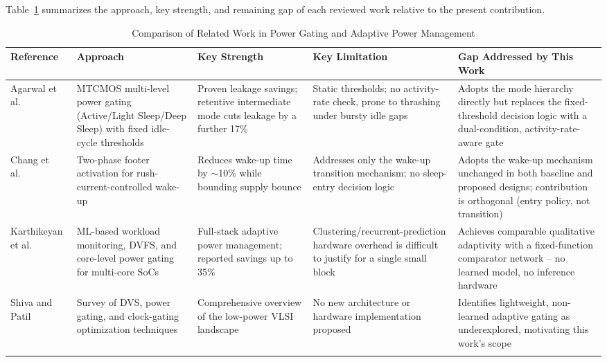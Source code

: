 Table~\ref{tab:related} summarizes the approach, key strength, and remaining gap of each reviewed work relative to the present contribution.

\begin{table}[t]
\centering
\footnotesize
\caption{Comparison of Related Work in Power Gating and Adaptive Power Management}
\label{tab:related}
\setlength{\tabcolsep}{3pt}
\renewcommand{\arraystretch}{1.3}
\begin{tabular}{@{}p{2.3cm} p{3.3cm} p{3.6cm} p{3.6cm} p{3.9cm}@{}}
\toprule
\textbf{Reference} & \textbf{Approach} & \textbf{Key Strength} & \textbf{Key Limitation} & \textbf{Gap Addressed by This Work} \\
\midrule
Agarwal et al.\ \cite{agarwal2006} &
MTCMOS multi-level power gating (Active/Light Sleep/Deep Sleep) with fixed idle-cycle thresholds &
Proven leakage savings; retentive intermediate mode cuts leakage by a further 17\% &
Static thresholds; no activity-rate check, prone to thrashing under bursty idle gaps &
Adopts the mode hierarchy directly but replaces the fixed-threshold decision logic with a dual-condition, activity-rate-aware gate \\
\addlinespace
Chang et al.\ \cite{chang2012} &
Two-phase footer activation for rush-current-controlled wake-up &
Reduces wake-up time by $\sim$10\% while bounding supply bounce &
Addresses only the wake-up transition mechanism; no sleep-entry decision logic &
Adopts the wake-up mechanism unchanged in both baseline and proposed designs; contribution is orthogonal (entry policy, not transition) \\
\addlinespace
Karthikeyan et al.\ \cite{karthikeyan2025} &
ML-based workload monitoring, DVFS, and core-level power gating for multi-core SoCs &
Full-stack adaptive power management; reported savings up to 35\% &
Clustering/recurrent-prediction hardware overhead is difficult to justify for a single small block &
Achieves comparable qualitative adaptivity with a fixed-function comparator network -- no learned model, no inference hardware \\
\addlinespace
Shiva and Patil \cite{shiva2025} &
Survey of DVS, power gating, and clock-gating optimization techniques &
Comprehensive overview of the low-power VLSI landscape &
No new architecture or hardware implementation proposed &
Identifies lightweight, non-learned adaptive gating as underexplored, motivating this work's scope \\
\addlinespace

\end{tabular}
\end{table}
